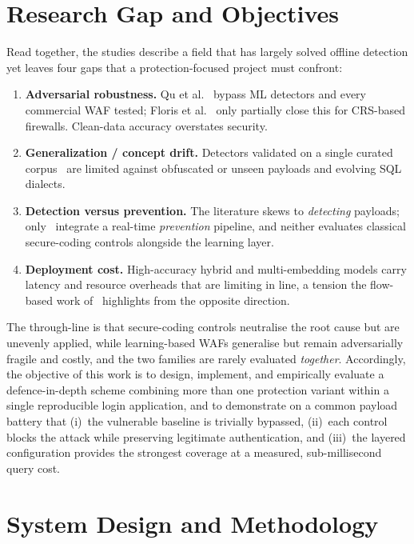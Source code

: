 \documentclass[pdflatex,sn-mathphys-num]{sn-jnl}
\begin{document}
\section{Research Gap and Objectives}\label{sec:gap}

Read together, the studies describe a field that has largely solved offline detection
yet leaves four gaps that a protection-focused project must confront:
\begin{enumerate}
\item \textbf{Adversarial robustness.} Qu et al.~\cite{qu2024advsqli} bypass ML
detectors and every commercial WAF tested; Floris et al.~\cite{floris2025modsec} only
partially close this for CRS-based firewalls. Clean-data accuracy overstates security.
\item \textbf{Generalization / concept drift.} Detectors validated on a single curated
corpus~\cite{alghawazi2023rnn,thalji2023aenet,arasteh2024graywolf,bakir2025uniembed}
are limited against obfuscated or unseen payloads and evolving SQL dialects.
\item \textbf{Detection versus prevention.} The literature skews to \emph{detecting}
payloads; only~\cite{paul2024sqlreaper,ahmed2026deployment} integrate a real-time
\emph{prevention} pipeline, and neither evaluates classical secure-coding controls
alongside the learning layer.
\item \textbf{Deployment cost.} High-accuracy hybrid and multi-embedding models carry
latency and resource overheads that are limiting in line, a tension the flow-based work
of~\cite{crespo2023sqli} highlights from the opposite direction.
\end{enumerate}

The through-line is that secure-coding controls neutralise the root cause but are
unevenly applied, while learning-based WAFs generalise but remain adversarially fragile
and costly, and the two families are rarely evaluated \emph{together}. Accordingly, the
objective of this work is to design, implement, and empirically evaluate a
defence-in-depth scheme combining more than one protection variant within a single
reproducible login application, and to demonstrate on a common payload battery that
(i)~the vulnerable baseline is trivially bypassed, (ii)~each control blocks the attack
while preserving legitimate authentication, and (iii)~the layered configuration provides
the strongest coverage at a measured, sub-millisecond query cost.

\section{System Design and Methodology}\label{sec:method}
\end{document}
